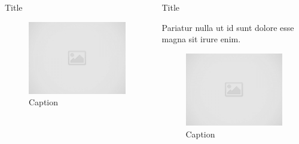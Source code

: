 \documentclass[final]{beamer}
\newlength{\onecolwid}
\newlength{\twocolwid}
\begin{document}
\begin{frame}[t]
\begin{columns}[t]
\begin{column}{\twocolwid}
\begin{columns}[t,totalwidth=\twocolwid]
\begin{column}{\onecolwid}
\begin{block}{Title}
                \begin{figure}
                    \includegraphics[width=0.5\linewidth]{images/placeholder.jpg}
                    \caption{Caption}
                \end{figure}

            \end{block}
            
        
        \end{column} %
        
        \begin{column}{\onecolwid} %
        
            
            \begin{block}{Title}
            
                Pariatur nulla ut id sunt dolore esse magna sit irure enim. \\[0.2in]
        
                \begin{figure}
                    \includegraphics[width=0.7\linewidth]{images/placeholder.jpg}
                    \caption{Caption}
                \end{figure}


\end{block}
\end{column}
\end{columns}
\end{column}
\end{columns}
\end{frame}
\end{document}
